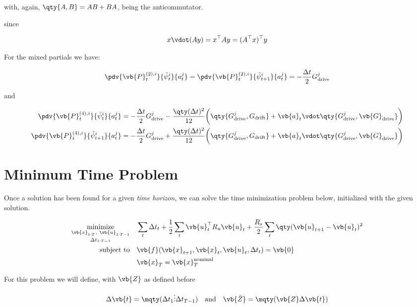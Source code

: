 \documentclass{article}
\newcommand{\isopsi}{\tilde \psi}
\begin{document}
\hfill

with, again, $\qty{A, B} = AB + BA$, being the anticommutator.

\hfill

since

$$
x \vdot (Ay) = x^\top A y = (A^\top x)^\top y
$$

For the mixed partials we have:

\begin{equation}
  \pdv{\vb{P}_t^{(2), i}}{\isopsi_t^i}{a^j_t} = \pdv{\vb{P}_t^{(2), i}}{\isopsi_{t+1}^i}{a^j_t} = -\frac{\Delta t}{2} G^j_{\text{drive}}
\end{equation}

and 

\begin{align}
  \pdv{\vb{P}_t^{(4), i}}{\isopsi_t^i}{a^j_t} &= -\frac{\Delta t}{2} G^j_{\text{drive}} - \frac{\qty(\Delta t)^2}{12}\bigg( \qty{G^j_{\text{drive}}, G_{\text{drift}}} + \vb{a}_t \vdot \qty{G^j_{\text{drive}}, \vb{G}_{\text{drive}}} \bigg)\\
  \pdv{\vb{P}_t^{(4), i}}{\isopsi_{t+1}^i}{a^j_t} &= -\frac{\Delta t}{2} G^j_{\text{drive}} + \frac{\qty(\Delta t)^2}{12}\bigg( \qty{G^j_{\text{drive}}, G_{\text{drift}}} + \vb{a}_t \vdot \qty{G^j_{\text{drive}}, \vb{G}_{\text{drive}}} \bigg)
\end{align}

\section{Minimum Time Problem}

Once a solution has been found for a given \textit{time horizon}, we can solve the time minimization problem below, initialized with the given solution.

\begin{align*}
  \underset{\Delta t_{1:T-1}}{\underset{\vb{x}_{1:T}, \ \vb{u}_{1:T-1}}{\text{minimize}}} & 
  \quad \sum_t \Delta t_t + \frac{1}{2} \sum_t \vb{u}_t^\top R_u \vb{u}_t + \frac{R_s}{2} \sum_t \qty(\vb{u}_{t+1} - \vb{u}_t)^2\\
  \text{subject to} & \quad \vb{f}(\vb{x}_{t+1}, \vb{x}_t, \vb{u}_t, \Delta t_t) = \vb{0}\\
  & \quad \vb{x}_T = \vb{x}^\text{nominal}_T
\end{align*}

For this problem we will define, with $\vb{Z}$ as defined before 

$$
  \Delta \vb{t} = \mqty(
    \Delta t_1 \\ 
    \vdots \\ 
    \Delta t_{T-1}
  )
  \quad \text{and} \quad
  \vb{\bar Z} = \mqty(\vb{Z} \\ \Delta \vb{t})
$$
\end{document}
